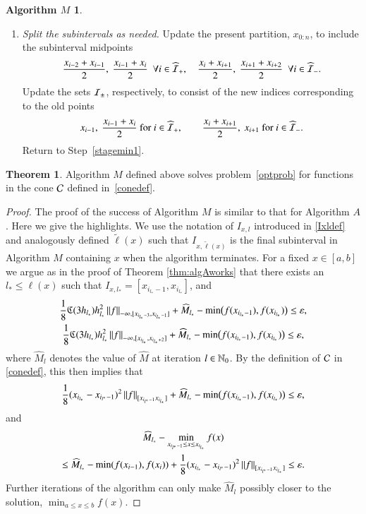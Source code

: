 \documentclass[review]{elsarticle}
\newcommand{\abstol}{\varepsilon}
\theoremstyle{definition}
\newtheorem*{algoM}{Algorithm $M$}
\newcommand{\tell}{\tilde{\ell}}
\newcommand{\hM}{\widehat{M}}
\newtheorem{theorem}{Theorem}
\newcommand{\minfii}{\min(f(x_{i-1}), f(x_i))} %
\begin{document}
\begin{algoM}
\begin{enumerate}[\em Step 1.]
		\item \label{stagemin2} \emph{Split the subintervals as needed.}
		Update the present partition, $x_{0:n}$, to include the subinterval midpoints
		\begin{equation*}
		\frac{x_{i-2} +x_{i-1}}{2}, \ \frac{x_{i-1} +x_{i}}{2} \ \ \forall i \in \widehat{\ci}_+, \quad 
		\frac{x_{i} +x_{i+1}}{2}, \  \frac{x_{i+1} +x_{i+2}}{2} \ \ \forall  i \in \widehat{\ci}_-.
		\end{equation*}
		Update the sets $\mathcal{I}_{\pm}$, respectively, to consist of the new indices corresponding to the old points 
		\[
		x_{i-1}, \ \frac{x_{i-1} +x_{i}}{2} \text{ for } i \in \widehat{\mathcal{I}}_+, \qquad  \frac{x_{i} +x_{i+1}}{2}, \  x_{i+1} \text{ for } i \in \widehat{\mathcal{I}}_-.
		\] 
		Return to Step~\ref{stagemin1}.
	\end{enumerate}
\end{algoM}

\begin{theorem} \label{thm:algMworks}
Algorithm $M$ defined above solves problem~\eqref{optprob} for functions in the
cone $\mathcal{C}$ defined in~\eqref{conedef}.
\end{theorem}

\begin{proof}
	The proof of the success of Algorithm $M$ is similar to that for Algorithm $A$. Here we give the highlights.     We use the notation of $I_{x,l}$ introduced in \eqref{Ixldef} and analogously defined $\tell(x)$ such that $I_{x,\tell(x)}$ is the final subinterval in Algorithm $M$ containing $x$ when the algorithm terminates.   For a fixed $x \in [a,b]$ we argue as in the proof of Theorem \ref{thm:algAworks} that there exists an $l_{*} \le \ell(x)$ such that $I_{x,l_*} =[x_{i_{l_*}-1},x_{i_{l_*}}]$, and
	\begin{gather*}
	\frac{1} 8 \fC(3h_{l_*}) h_{l_*}^2 \norm[-\infty,{[x_{i_{l_*}-3},x_{i_{l_*}-1}]}]{f} + \hM_{l_*} -  \min\bigl(f(x_{i_{l_*}-1}),f(x_{i_{l_*}})\bigr)   \le \abstol , \\
	\frac{1} 8 \fC(3h_{l_*}) h_{l_*}^2 \norm[-\infty,{[x_{i_{l_*}},x_{i_{l_*}+2}]}]{f} +  \hM_{l_*} -  \min\bigl(f(x_{i_{l_*}-1}),f(x_{i_{l_*}})\bigr)   \le \abstol,
	\end{gather*}
	where $ \hM_{l}$ denotes the value of $\hM$ at iteration $l \in \mathbb{N}_{0}$.  By the definition of $\mathcal{C}$ in \eqref{conedef}, this then implies that
	\[
	\frac{1}{8} (x_{i_{l_*}} - x_{i_{l^*}-1})^2\norm[{[x_{i_{l^*}-1} x_{i_{l_*}}]}]{f} + \hM_{l_*} -  \min\bigl(f(x_{i_{l_*}-1}),f(x_{i_{l_*}})\bigr)   \le \abstol,
	\]
	and
		\begin{multline*}
		\hM_{l_*} - \min_{x_{i_{l^*}-1} \le x \le x_{i_{l_*}}} f(x) \\
		\le \hM_{l_*}  - \minfii + \frac{1}{8} (x_{i_{l_*}} - x_{i_{l^*}-1})^2\norm[{[x_{i_{l^*}-1} x_{i_{l_*}}]}]{f} \le  \abstol.
		\end{multline*}
Further iterations of the algorithm can only make $\hM_{l}$ possibly closer to the solution, $\min_{a \le x \le b} f(x) $.
\end{proof}
\end{document}

